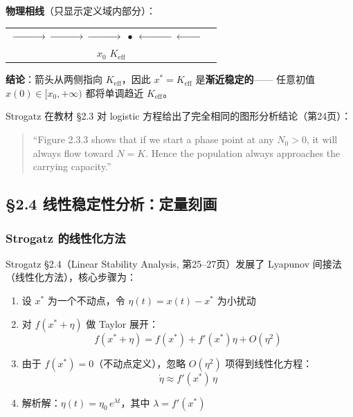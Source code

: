 \documentclass[12pt,a4paper]{article}
\begin{document}
\textbf{物理相线}（只显示定义域内部分）：

\begin{center}
\begin{tabular}{c}
$\xrightarrow{\hspace{2cm}} \xrightarrow{\hspace{2cm}} \xrightarrow{\hspace{2cm}}
\;\bullet\; \xleftarrow{\hspace{2cm}} \xleftarrow{\hspace{2cm}}$ \\[4pt]
$x_0$ \hspace{3.5cm} $K_{\text{eff}}$ \hspace{3.5cm}
\end{tabular}
\end{center}

\textbf{结论}：箭头从两侧指向 $K_{\text{eff}}$，因此 $x^* = K_{\text{eff}}$ 是\textbf{渐近稳定的}——
任意初值 $x(0) \in [x_0, +\infty)$ 都将单调趋近 $K_{\text{eff}}$。

Strogatz 在教材 \S2.3 对 logistic 方程给出了完全相同的图形分析结论（第24页）：
\begin{quote}
\small
``Figure 2.3.3 shows that if we start a phase point at any $N_0 > 0$, it will always flow
toward $N = K$. Hence the population always approaches the carrying capacity.''
\end{quote}

\subsection{\S2.4 线性稳定性分析：定量刻画}

\subsubsection{Strogatz 的线性化方法}
Strogatz \S2.4（Linear Stability Analysis, 第25--27页）发展了 Lyapunov 间接法
（线性化方法），核心步骤为：

\begin{enumerate}[label=(\arabic*)]
  \item 设 $x^*$ 为一个不动点，令 $\eta(t) = x(t) - x^*$ 为小扰动
  \item 对 $f(x^* + \eta)$ 做 Taylor 展开：
        \begin{equation}
        f(x^* + \eta) = f(x^*) + f'(x^*)\eta + O(\eta^2)
        \end{equation}
  \item 由于 $f(x^*) = 0$（不动点定义），忽略 $O(\eta^2)$ 项得到线性化方程：
        \begin{equation}
        \dot{\eta} \approx f'(x^*)\,\eta
        \end{equation}
  \item 解析解：$\eta(t) = \eta_0 \, e^{\lambda t}$，其中 $\lambda = f'(x^*)$
\end{enumerate}
\end{document}
